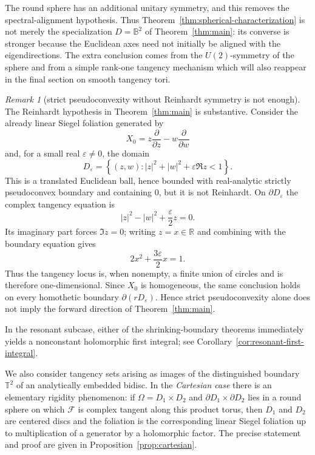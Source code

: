 \documentclass[11pt,reqno]{article}
\theoremstyle{remark}
\newtheorem*{remark}{Remark}
\newcommand{\R}{\mathbb R}
\newcommand{\F}{\mathcal F}
\newcommand{\Om}{\Omega}
\newcommand{\T}{\mathbb T}
\begin{document}
The round sphere has an additional unitary symmetry, and this removes the spectral-alignment hypothesis.
Thus Theorem~\ref{thm:spherical-characterization} is not merely the specialization $D=\mathbb B^2$ of Theorem~\ref{thm:main}: its converse is stronger because the Euclidean axes need not initially be aligned with the eigendirections. The extra conclusion comes from the $U(2)$-symmetry of the sphere and from a simple rank-one tangency mechanism which will also reappear in the final section on smooth tangency tori.

\begin{remark}[strict pseudoconvexity without Reinhardt symmetry is not enough]
The Reinhardt hypothesis in Theorem~\ref{thm:main} is substantive. Consider the already linear Siegel foliation generated by
\[
 X_0=z\frac{\partial}{\partial z}-w\frac{\partial}{\partial w}
\]
and, for a small real $\varepsilon\neq0$, the domain
\[
 D_\varepsilon
 =\left\{(z,w):|z|^2+|w|^2+\varepsilon\Re z<1\right\}.
\]
This is a translated Euclidean ball, hence bounded with real-analytic strictly pseudoconvex boundary and containing $0$, but it is not Reinhardt. On $\partial D_\varepsilon$ the complex tangency equation is
\[
 |z|^2-|w|^2+\frac{\varepsilon}{2}z=0.
\]
Its imaginary part forces $\Im z=0$; writing $z=x\in\R$ and combining with the boundary equation gives
\[
 2x^2+\frac{3\varepsilon}{2}x=1.
\]
Thus the tangency locus is, when nonempty, a finite union of circles and is therefore one-dimensional. Since $X_0$ is homogeneous, the same conclusion holds on every homothetic boundary $\partial(rD_\varepsilon)$. Hence strict pseudoconvexity alone does not imply the forward direction of Theorem~\ref{thm:main}.
\end{remark}

In the resonant subcase, either of the shrinking-boundary theorems immediately yields a nonconstant holomorphic first integral; see Corollary~\ref{cor:resonant-first-integral}.

We also consider tangency sets arising as images of the distinguished boundary $\T^2$ of an analytically embedded bidisc. In the {\em Cartesian case} there is an elementary rigidity phenomenon: if $\Om=D_1\times D_2$ and $\partial D_1\times\partial D_2$ lies in a round sphere on which $\F$ is complex tangent along this product torus, then $D_1$ and $D_2$ are centered discs and the foliation is the corresponding linear Siegel foliation up to multiplication of a generator by a holomorphic factor. The precise statement and proof are given in Proposition~\ref{prop:cartesian}.
\end{document}
